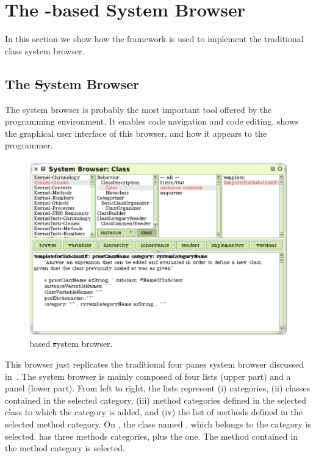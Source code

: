\documentclass[a4paper,10pt,twoside]{book}
\begin{document}


\section{The \ob-based System Browser} 

In this section we show how the framework is used to implement the traditional class system browser. 

\subsection{The \st System Browser}
The system browser is probably the most important tool offered by the \pharo programming environment. It enables code navigation and code editing.  shows the graphical user interface of this browser, and how it appears to the \st programmer. 


\begin{figure}[!ht]
\begin{center}
\includegraphics[scale=0.50]{obbrowser.pdf}
\caption{\ob based \st system browser.} 
\end{center}
\end{figure}

This browser just replicates the traditional four panes system browser discussed in~.
The system browser is mainly composed of four lists (upper part) and a panel (lower part). From left to right, the lists represent (i) categories, (ii) classes contained in the selected category, (iii) method categories defined in the selected class to which the  category is added, and (iv) the list of methods defined in the selected method category. On , the class named , which belongs to the category  is selected.  has three methods categories, plus the  one. The method  contained in the  method category is selected.
\end{document}
